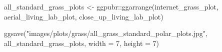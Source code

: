 \documentclass[
  letterpaper,
  DIV=11,
  numbers=noendperiod]{scrreprt}
\newenvironment{Shaded}{\begin{snugshade}}{\end{snugshade}}
\newcommand{\AttributeTok}[1]{\textcolor[rgb]{0.40,0.45,0.13}{#1}}
\newcommand{\DecValTok}[1]{\textcolor[rgb]{0.68,0.00,0.00}{#1}}
\newcommand{\FunctionTok}[1]{\textcolor[rgb]{0.28,0.35,0.67}{#1}}
\newcommand{\NormalTok}[1]{\textcolor[rgb]{0.00,0.23,0.31}{#1}}
\newcommand{\OtherTok}[1]{\textcolor[rgb]{0.00,0.23,0.31}{#1}}
\newcommand{\SpecialCharTok}[1]{\textcolor[rgb]{0.37,0.37,0.37}{#1}}
\newcommand{\StringTok}[1]{\textcolor[rgb]{0.13,0.47,0.30}{#1}}
\begin{document}
\begin{Shaded}
\begin{Highlighting}[]
\NormalTok{all\_standard\_grass\_plots }\OtherTok{\textless{}{-}}\NormalTok{ ggpubr}\SpecialCharTok{::}\FunctionTok{ggarrange}\NormalTok{(internet\_grass\_plot, }
\NormalTok{                                             aerial\_living\_lab\_plot, }
\NormalTok{                                             close\_up\_living\_lab\_plot)}

\FunctionTok{ggsave}\NormalTok{(}\StringTok{"images/plots/grass/all\_grass\_standard\_polar\_plots.jpg"}\NormalTok{, }
\NormalTok{       all\_standard\_grass\_plots, }
       \AttributeTok{width =} \DecValTok{7}\NormalTok{, }
       \AttributeTok{height =} \DecValTok{7}\NormalTok{)}
\end{Highlighting}
\end{Shaded}
\end{document}
